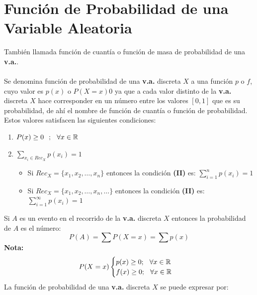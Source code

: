\section{Función de Probabilidad de una Variable Aleatoria}
\noindent También llamada función de cuantía o función de masa de probabilidad de una \textbf{v.a.}. \\${ }$\\
Se denomina función de probabilidad de una \textbf{v.a.} discreta $X$ a una función $p$ o $f$, cuyo valor es $p(x)$ o $P(X=x)0$ ya que a cada valor distinto de la \textbf{v.a.} discreta $X$ hace corresponder en un número entre los valores $[0,1]$ que es su probabilidad, de ahí el nombre de función de cuantía o función de probabilidad. Estos valores satisfacen las siguientes condiciones:
\begin{enumerate}
\item $P(x)\geq 0 \hspace{0.25cm};\hspace{0.25cm} \forall x\in \mathbb{R}$
\item $\displaystyle\sum_{x_i\in Rec_X}^{}p(x_i)=1$
\begin{itemize}
\item Si $Rec_X=\lbrace x_1,x_2,\ldots ,x_n \rbrace$ entonces la condición \textbf{(II)} es: $\displaystyle\sum_{i=1}^{n}p(x_i)=1$
\item Si $Rec_X=\lbrace x_1,x_2,\ldots ,x_n,\ldots \rbrace$ entonces la condición \textbf{(II)} es: $\displaystyle\sum_{i=1}^{\infty}p(x_i)=1$
\end{itemize}
\end{enumerate}
Si $A$ es un evento en el recorrido de la \textbf{v.a.} discreta $X$ entonces la probabilidad de $A$ es el número:
$$P(A)=\displaystyle\sum P(X=x)=\sum p(x)$$
\textbf{Nota:}
$$P(X=x)
\begin{cases}
p(x)\geq 0 ;\hspace{0.25cm} \forall x\in \mathbb{R} \\
f(x)\geq 0 ;\hspace{0.25cm} \forall x\in \mathbb{R}
\end{cases}
$$
La función de probabilidad de una \textbf{v.a.} discreta $X$ se puede expresar por:
